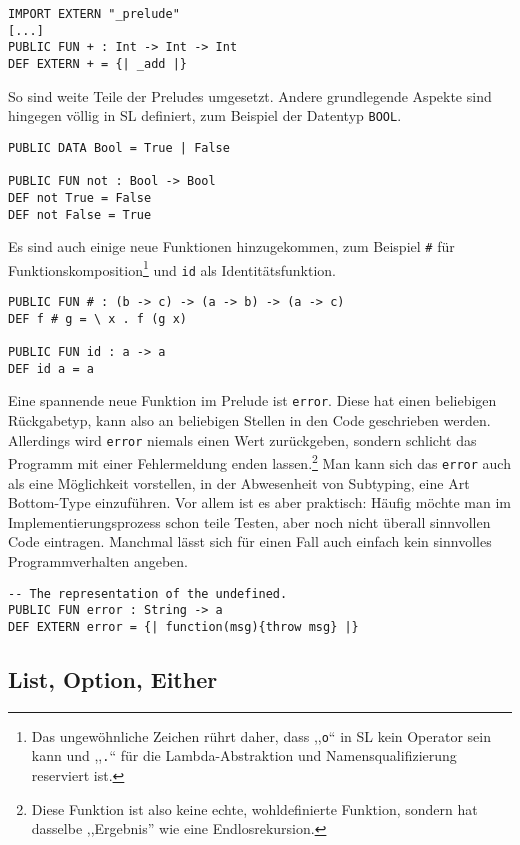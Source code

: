 \documentclass[runningheads]{llncs}
\begin{document}
\begin{verbatim}
IMPORT EXTERN "_prelude" 
[...]
PUBLIC FUN + : Int -> Int -> Int
DEF EXTERN + = {| _add |}
\end{verbatim}

So sind weite Teile der Preludes umgesetzt. Andere grundlegende Aspekte
sind hingegen völlig in SL definiert, zum Beispiel der Datentyp \verb|BOOL|.

\begin{verbatim}
PUBLIC DATA Bool = True | False

PUBLIC FUN not : Bool -> Bool
DEF not True = False
DEF not False = True
\end{verbatim}

Es sind auch einige neue Funktionen hinzugekommen, zum Beispiel \verb|#|
für Funktionskomposition\footnote{Das ungewöhnliche Zeichen rührt daher,
dass ,,\texttt{o}`` in SL kein Operator sein kann und ,,\texttt{.}`` für die
Lambda-Abstraktion und Namensqualifizierung reserviert ist.} und
\verb|id| als Identitätsfunktion.

\begin{verbatim}
PUBLIC FUN # : (b -> c) -> (a -> b) -> (a -> c)
DEF f # g = \ x . f (g x)

PUBLIC FUN id : a -> a
DEF id a = a
\end{verbatim}

Eine spannende neue Funktion im Prelude ist \verb|error|. Diese hat einen
beliebigen Rückgabetyp, kann also an beliebigen Stellen in den Code
geschrieben werden. Allerdings wird \verb|error| niemals einen Wert
zurückgeben, sondern schlicht das Programm mit einer Fehlermeldung enden
lassen.\footnote{Diese Funktion ist also keine echte, wohldefinierte Funktion,
sondern hat dasselbe ,,Ergebnis'' wie eine Endlosrekursion.} Man kann sich
das \verb|error| auch als eine Möglichkeit vorstellen, in der Abwesenheit von
Subtyping, eine Art Bottom-Type einzuführen. Vor allem ist es aber praktisch:
Häufig möchte man im Implementierungsprozess schon teile Testen, aber noch
nicht überall sinnvollen Code eintragen. Manchmal lässt sich für einen
Fall auch einfach kein sinnvolles Programmverhalten angeben.

\begin{verbatim}
-- The representation of the undefined.
PUBLIC FUN error : String -> a
DEF EXTERN error = {| function(msg){throw msg} |} 
\end{verbatim}

\subsection{List, Option, Either}
\end{document}
